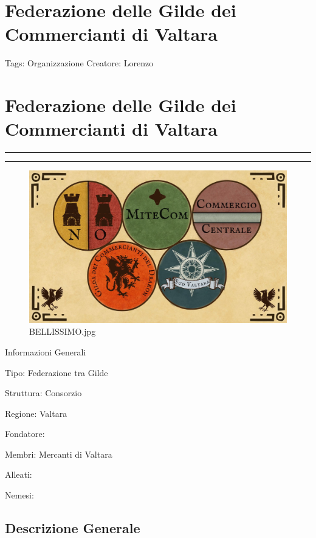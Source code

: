 \section{Federazione delle Gilde dei Commercianti di
Valtara}\label{federazione-delle-gilde-dei-commercianti-di-valtara}

Tags: Organizzazione Creatore: Lorenzo

\section{Federazione delle Gilde dei Commercianti di
Valtara}\label{federazione-delle-gilde-dei-commercianti-di-valtara-1}

\begin{center}\rule{0.5\linewidth}{0.5pt}\end{center}

\begin{center}\rule{0.5\linewidth}{0.5pt}\end{center}

\begin{figure}
\centering
\includegraphics{BELLISSIMO.jpg}
\caption{BELLISSIMO.jpg}
\end{figure}

Informazioni Generali

Tipo: Federazione tra Gilde

Struttura: Consorzio

Regione: Valtara

Fondatore:

Membri: Mercanti di Valtara

Alleati:

Nemesi:

\subsection{Descrizione Generale}\label{descrizione-generale}

